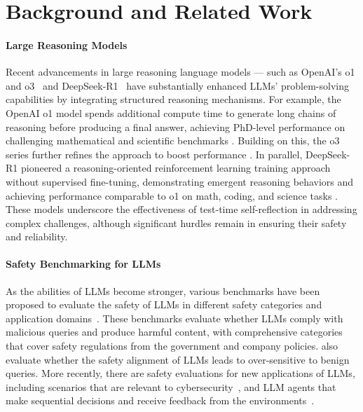 \section{Background and Related Work}

\paragraph{Large Reasoning Models} 
Recent advancements in large reasoning language models — such as OpenAI’s o1 and o3~\cite{o1card,o3minicard} and DeepSeek-R1~\cite{guo2025deepseek} have substantially enhanced LLMs’ problem-solving capabilities by integrating structured reasoning mechanisms. For example, the OpenAI o1 model spends additional compute time to generate long chains of reasoning before producing a final answer, achieving PhD-level performance on challenging mathematical and scientific benchmarks \citep{o1card}. Building on this, the o3 series further refines the approach to boost performance \citep{o3minicard}. In parallel, DeepSeek-R1 pioneered a reasoning-oriented reinforcement learning training approach without supervised fine-tuning, demonstrating emergent reasoning behaviors and achieving performance comparable to o1 on math, coding, and science tasks \cite{guo2025deepseek}. These models underscore the effectiveness of test-time self-reflection in addressing complex challenges, although significant hurdles remain in ensuring their safety and reliability.


\paragraph{Safety Benchmarking for LLMs} 
As the abilities of LLMs become stronger, various benchmarks have been proposed to evaluate the safety of LLMs in different safety categories and application domains~\cite{wang2023not,bhatt2024cyberseceval,wan2024cyberseceval,li2024salad,xie2024sorry,zeng2024air,andriushchenko2024agentharm}. 
These benchmarks evaluate whether LLMs comply with malicious queries and produce harmful content, with comprehensive categories that cover safety regulations from the government and company policies. \citet{rottger2023xstest} also evaluate whether the safety alignment of LLMs leads to over-sensitive to benign queries. 
More recently, there are safety evaluations for new applications of LLMs, including scenarios that are relevant to cybersecurity~\cite{wan2024cyberseceval,bhatt2024cyberseceval}, and LLM agents that make sequential decisions and receive feedback from the environments~\cite{andriushchenko2024agentharm}.

